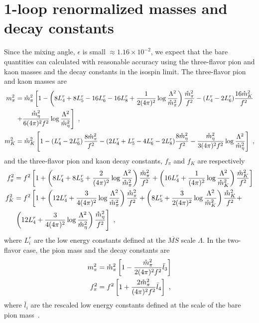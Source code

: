 \documentclass[12pt]{elsarticle}
\begin{document}
\section{1-loop renormalized masses and decay constants}
\label{sec:renormalized}
\noindent
Since the mixing angle, $\epsilon$ is small $\approx1.16\times10^{-2}$, we expect that the bare quantities can calculated with reasonable accuracy using the three-flavor pion and kaon masses and the decay constants in the isospin limit. The three-flavor pion and kaon masses are~\cite{Gasser:1984gg}
\begin{align}
\nonumber
\label{eq:pionmass3f}
m_{\pi}^2&=\mathring{m}_{\pi}^2\left[1-\left(8{L}_4^r+8{L}_5^r-16{L}_6^r-16{L}_8^r+{1\over2(4\pi)^2}\log{\Lambda^2\over \mathring{m}_{\pi}^2}\right){\mathring{m}_{\pi}^2\over f^2}-({L}_4^r-2{L}_6^r){16\mathring{m}_{K}^2\over f^2}\right.\\
&\left.+{\mathring{m}_{\eta}^2\over6(4\pi)^2f^2}\log{\Lambda^2\over \mathring{m}_{\eta}^2}\right]\ ,\\
\label{eq:kaonmass3f}
m_{K}^2&=\mathring{m}_{K}^2\left[1-\left({L}_4^r-2{L}_6^r\right){8\mathring{m}_{\pi}^2\over f^2}-(2L_4^r+{L}_5^r-4L_6^r-2{L}_8^r){8\mathring{m}_{\eta}^2\over f^2}-{\mathring{m}_{\eta}^2\over3(4\pi)^2f^2}\log{\Lambda^2\over \mathring{m}_{\eta}^2}\right]\ ,
\end{align}
and the three-flavor pion and kaon decay constants, $f_{\pi}$ and $f_{K}$ are respectively~\cite{Gasser:1984gg}
\begin{align}
\label{eq:piondecay3f}
f_{\pi}^2&=f^2\left[1+\left(8{L}_4^r+8L_5^r+{2\over(4\pi)^2}\log{\Lambda^2\over \mathring{m}_{\pi}^2}
\right){\mathring{m}_{\pi}^2\over f^2}+\left(16L_4^r+{1\over(4\pi)^2}\log{\Lambda^2\over \mathring{m}_{K}^2}\right){\mathring{m}_{K}^2\over f^2}\right]\\
\nonumber
f_K^2&=f^2\left[1+\left(12L_4^r+{3\over4(4\pi)^2}\log{\Lambda^2\over \mathring{m}_{\pi}^2}\right){\mathring{m}_{\pi}^2\over f^2}+\left(8L_5^r+{3\over2(4\pi)^2}\log{\Lambda^2\over \mathring{m}_{K}^2}\right){\mathring{m}_{K}^2\over f^2}+\right.\\
&\left.\left(12L_4^r+{3\over4(4\pi)^2}\log{\Lambda^2\over \mathring{m}_{\eta}^2}\right){\mathring{m}_{\eta}^2\over f^2}\right]\ ,
\end{align}
where $L^{r}_{i}$ are the low energy constants defined at the $\overline{MS}$ scale $\Lambda$. In the two-flavor case, the pion mass and the decay constants are
\begin{align}
\label{eq:pionmass2f}
m_{\pi}^{2}&=\mathring{m}_{\pi}^2\left[1-{\mathring{m}_{\pi}^2\over2(4\pi)^2f^2}\bar{l}_3\right]\\
\label{eq:piondecay2f}
f_{\pi}^2&=f^2\left[1+{2\mathring{m}_{\pi}^2\over(4\pi)^2f^2}\bar{l}_4\right]\ ,
\end{align}
where $\bar{l}_{i}$ are the rescaled low energy constants defined at the scale of the bare pion mass~\cite{Gasser:1983yg}.


\end{document}

